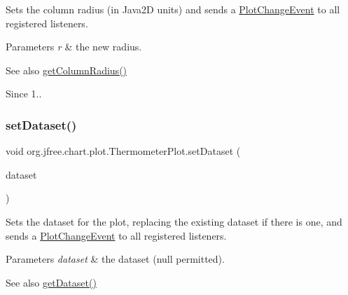 Sets the column radius (in Java2D units) and sends a \mbox{\hyperlink{}{Plot\+Change\+Event}} to all registered listeners.


\begin{DoxyParams}{Parameters}
{\em r} & the new radius.\\
\hline
\end{DoxyParams}
\begin{DoxySeeAlso}{See also}
\mbox{\hyperlink{classorg_1_1jfree_1_1chart_1_1plot_1_1_thermometer_plot_a74b63300dd2a147c902542e3b3c98085}{get\+Column\+Radius()}}
\end{DoxySeeAlso}
\begin{DoxySince}{Since}
1.. 
\end{DoxySince}
\mbox{\label{classorg_1_1jfree_1_1chart_1_1plot_1_1_thermometer_plot_ac864201509947b48e4a47c5a18c7f2c8}} 
\subsubsection{\texorpdfstring{set\+Dataset()}{setDataset()}}
{\footnotesize\ttfamily void org.\+jfree.\+chart.\+plot.\+Thermometer\+Plot.\+set\+Dataset (\begin{DoxyParamCaption}\item[{\mbox{\hyperlink{interfaceorg_1_1jfree_1_1data_1_1general_1_1_value_dataset}{Value\+Dataset}}}]{dataset }\end{DoxyParamCaption})}

Sets the dataset for the plot, replacing the existing dataset if there is one, and sends a \mbox{\hyperlink{}{Plot\+Change\+Event}} to all registered listeners.


\begin{DoxyParams}{Parameters}
{\em dataset} & the dataset ({\ttfamily null} permitted).\\
\hline
\end{DoxyParams}
\begin{DoxySeeAlso}{See also}
\mbox{\hyperlink{classorg_1_1jfree_1_1chart_1_1plot_1_1_thermometer_plot_a5208b3720ee7fcb6980a49f2cce81bf3}{get\+Dataset()}} 
\end{DoxySeeAlso}
\mbox{\label{classorg_1_1jfree_1_1chart_1_1plot_1_1_thermometer_plot_a3ac81f9e1ea131f4deb4a09c56460d69}} 

